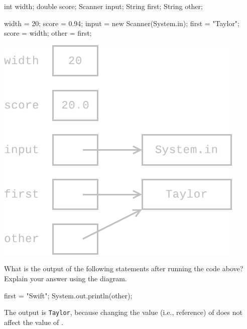 \begin{multicols}{2}

\begin{javalst}
int width;
double score;
Scanner input;
String first;
String other;

width = 20;
score = 0.94;
input = new Scanner(System.in);
first = "Taylor";
score = width;
other = first;
\end{javalst}

\columnbreak

\begin{answer}[3in]
\includegraphics{reference2.pdf}
\end{answer}

\end{multicols}


\Q What is the output of the following statements after running the code above?
Explain your answer using the diagram.

\begin{javalst}
first = "Swift";
System.out.println(other);
\end{javalst}

\begin{answer}
The output is \texttt{Taylor}, because changing the value (i.e., reference) of  does not affect the value of .
\end{answer}
